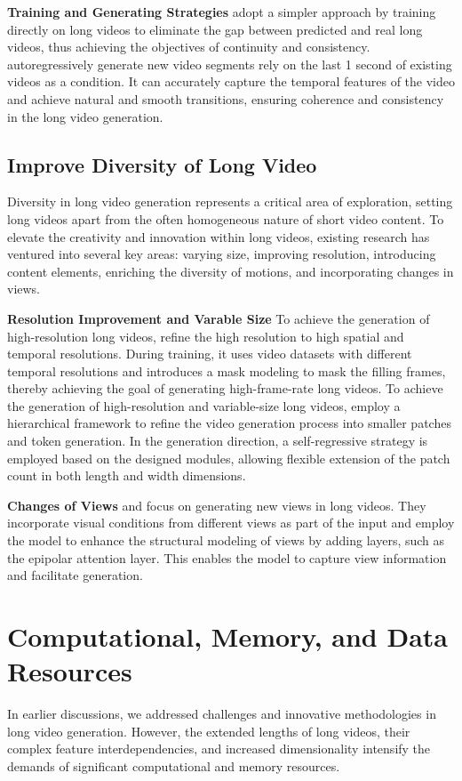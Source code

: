 \documentclass{article}
\begin{document}
\noindent\textbf{Training and Generating Strategies} 
\cite{MCVD} adopt a simpler approach by training directly on long videos to eliminate the gap between predicted and real long videos, thus achieving the objectives of continuity and consistency. \cite{VideoPoet} autoregressively generate new video segments rely on the last 1 second of existing videos as a condition. It can accurately capture the temporal features of the video and achieve natural and smooth transitions, ensuring coherence and consistency in the long video generation.
\subsection{Improve Diversity of Long Video}
Diversity in long video generation represents a critical area of exploration, setting long videos apart from the often homogeneous nature of short video content. To elevate the creativity and innovation within long videos, existing research has ventured into several key areas: varying size, improving resolution, introducing content elements, enriching the diversity of motions, and incorporating changes in views. 


\noindent\textbf{Resolution Improvement and Varable Size}
To achieve the generation of high-resolution long videos, \cite{align} refine the high resolution to high spatial and temporal resolutions. During training, it uses video datasets with different temporal resolutions and introduces a mask modeling to mask the filling frames, thereby achieving the goal of generating high-frame-rate long videos. To achieve the generation of high-resolution and variable-size long videos, \cite{NUWA-infinity} employ a hierarchical framework to refine the video generation process into smaller patches and token generation. In the generation direction, a self-regressive strategy is employed based on the designed modules, allowing flexible extension of the patch count in both length and width dimensions.


\noindent\textbf{Changes of Views}
\cite{transframer} and \cite{consistent} focus on generating new views in long videos. They incorporate visual conditions from different views as part of the input and employ the model to enhance the structural modeling of views by adding layers, such as the epipolar attention layer. This enables the model to capture view information and facilitate generation.
\section{Computational, Memory, and Data Resources}
\label{sec: computation}
In earlier discussions, we addressed challenges and innovative methodologies in long video generation. However, the extended lengths of long videos, their complex feature interdependencies, and increased dimensionality intensify the demands of significant computational and memory resources.
\end{document}
